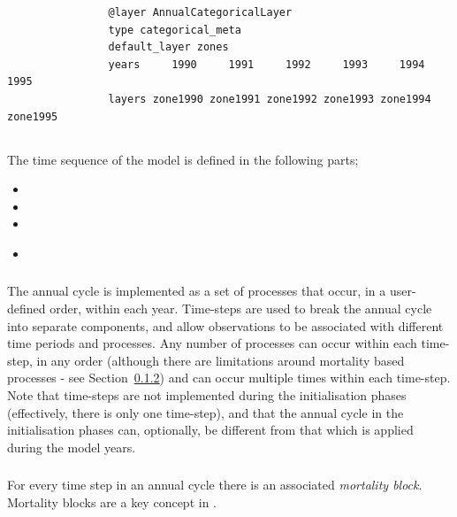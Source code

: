 \begin{enumerate}
\begin{enumerate}
		{\small{\begin{verbatim}
				@layer AnnualCategoricalLayer
				type categorical_meta
				default_layer zones
				years     1990     1991     1992     1993     1994     1995
				layers zone1990 zone1991 zone1992 zone1993 zone1994 zone1995
				\end{verbatim}}}
	\end{enumerate}
\end{enumerate}



\subsection{}

The time sequence of the model is defined in the following parts;
\begin{itemize}
  \item {}
  \item {}
  \item {}
  \item {}\textsl{}
\end{itemize}

\subsubsection{}
The annual cycle is implemented as a set of processes that occur, in a user-defined order, within each year. Time-steps are used to break the annual cycle into separate components, and allow observations to be associated with different time periods and processes. Any number of processes can occur within each time-step, in any order (although there are limitations around mortality based processes - see Section~\ref{sec:mortality_block}) and can occur multiple times within each time-step. Note that time-steps are not implemented during the initialisation phases (effectively, there is only one time-step), and that the annual cycle in the initialisation phases can, optionally, be different from that which is applied during the model years.

\subsubsection{}\label{sec:mortality_block}

For every time step in an annual cycle there is an associated \emph{mortality block}. Mortality blocks are a key concept in \IBM.

